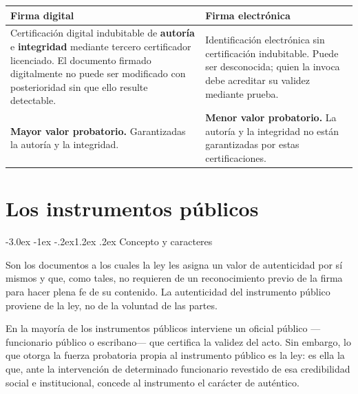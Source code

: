 \documentclass[12pt,oneside]{book}
\makeatletter
\renewcommand\section{\@startsection{section}{1}{\z@}%
  {-3.0ex \@plus -1ex \@minus -.2ex}{1.2ex \@plus .2ex}%
  {\normalfont\large\bfseries\color{acento}}}
\makeatother
\begin{document}
\begin{table}[H]
\centering
\begin{tabularx}{\textwidth}{>{\raggedright\arraybackslash}X
                              >{\raggedright\arraybackslash}X}
\toprule
\textbf{Firma digital} & \textbf{Firma electrónica} \\
\midrule
Certificación digital indubitable de \textbf{autoría} e \textbf{integridad} mediante tercero certificador licenciado. El documento firmado digitalmente no puede ser modificado con posterioridad sin que ello resulte detectable. & Identificación electrónica sin certificación indubitable. Puede ser desconocida; quien la invoca debe acreditar su validez mediante prueba. \\[6pt]
\textbf{Mayor valor probatorio.} Garantizadas la autoría y la integridad. & \textbf{Menor valor probatorio.} La autoría y la integridad no están garantizadas por estas certificaciones. \\
\bottomrule
\end{tabularx}
\end{table}


\chapter{Los instrumentos públicos}

\section{Concepto y caracteres}

\begin{definicion}
Son los documentos a los cuales la ley les asigna un valor de autenticidad por sí mismos y que, como tales, no requieren de un reconocimiento previo de la firma para hacer plena fe de su contenido. La autenticidad del instrumento público proviene de la ley, no de la voluntad de las partes.
\end{definicion}

En la mayoría de los instrumentos públicos interviene un oficial público ---funcionario público o escribano--- que certifica la validez del acto. Sin embargo, lo que otorga la fuerza probatoria propia al instrumento público es la ley: es ella la que, ante la intervención de determinado funcionario revestido de esa credibilidad social e institucional, concede al instrumento el carácter de auténtico.
\end{document}
